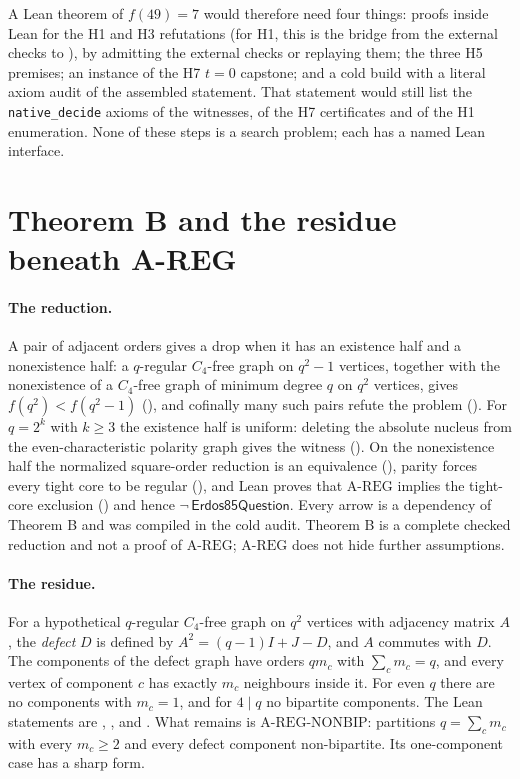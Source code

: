 \documentclass{anvil-paper}
\newcommand{\AREG}{\mathrm{A\text{-}REG}}
\newcommand{\NONBIP}{\mathrm{A\text{-}REG\text{-}NONBIP}}
\newcommand{\Qn}{\textsf{Erdos85Question}}
\theoremstyle{definition}
\begin{document}
A Lean theorem of $f(49)=7$ would therefore need four things: proofs inside Lean for the H1 and H3 refutations (for H1, this is the bridge from the external checks to ), by admitting the external checks or replaying them; the three H5 premises; an instance of the H7 $t=0$ capstone; and a cold build with a literal axiom audit of the assembled statement. That statement would still list the \texttt{native\_decide} axioms of the witnesses, of the H7 certificates and of the H1 enumeration. None of these steps is a search problem; each has a named Lean interface.

\section{Theorem B and the residue beneath A-REG}\label{sec:theoremB}

\paragraph{The reduction.} A pair of adjacent orders gives a drop when it has an existence half and a nonexistence half: a $q$-regular $C_4$-free graph on $q^2-1$ vertices, together with the nonexistence of a $C_4$-free graph of minimum degree $q$ on $q^2$ vertices, gives $f(q^2)<f(q^2-1)$ (), and cofinally many such pairs refute the problem (). For $q=2^k$ with $k\ge 3$ the existence half is uniform: deleting the absolute nucleus from the even-characteristic polarity graph gives the witness (). On the nonexistence half the normalized square-order reduction is an equivalence (), parity forces every tight core to be regular (), and Lean proves that $\AREG$ implies the tight-core exclusion () and hence $\neg\,\Qn$. Every arrow is a dependency of Theorem B and was compiled in the cold audit. Theorem B is a complete checked reduction and not a proof of $\AREG$; $\AREG$ does not hide further assumptions.

\paragraph{The residue.} For a hypothetical $q$-regular $C_4$-free graph on $q^2$ vertices with adjacency matrix $A$, the \emph{defect} $D$ is defined by $A^2=(q-1)I+J-D$, and $A$ commutes with $D$. The components of the defect graph have orders $qm_c$ with $\sum_c m_c=q$, and every vertex of component $c$ has exactly $m_c$ neighbours inside it. For even $q$ there are no components with $m_c=1$, and for $4\mid q$ no bipartite components. The Lean statements are , ,  and . What remains is $\NONBIP$: partitions $q=\sum_c m_c$ with every $m_c\ge 2$ and every defect component non-bipartite. Its one-component case has a sharp form.
\end{document}
